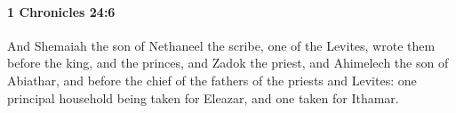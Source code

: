 
		\paragraph{1 Chronicles 24:6} %
			\label{1CHRONICLES-24-6}

			And Shemaiah the son of Nethaneel the scribe, one of the Levites, wrote them before the king, and the princes, and Zadok the priest, and Ahimelech the son of Abiathar, and before the chief of the fathers of the priests and Levites: one principal household being taken for Eleazar, and one taken for Ithamar.


